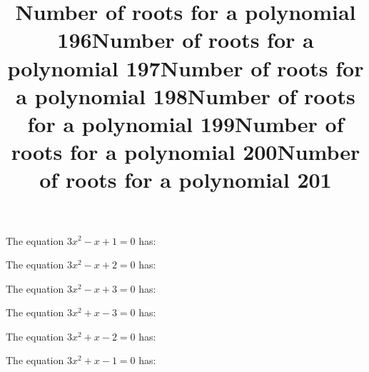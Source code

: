 \documentclass{article}
\begin{document}
\begin{category}
\begin{question}[multichoice]

\end{question}
\begin{question}[multichoice]
\title{Number of roots for a polynomial 196}
The equation $3 x^{2} - x + 1=0$ has:


\end{question}
\begin{question}[multichoice]
\title{Number of roots for a polynomial 197}
The equation $3 x^{2} - x + 2=0$ has:


\end{question}
\begin{question}[multichoice]
\title{Number of roots for a polynomial 198}
The equation $3 x^{2} - x + 3=0$ has:


\end{question}
\begin{question}[multichoice]
\title{Number of roots for a polynomial 199}
The equation $3 x^{2} + x - 3=0$ has:


\end{question}
\begin{question}[multichoice]
\title{Number of roots for a polynomial 200}
The equation $3 x^{2} + x - 2=0$ has:


\end{question}
\begin{question}[multichoice]
\title{Number of roots for a polynomial 201}
The equation $3 x^{2} + x - 1=0$ has:



\end{question}
\end{category}
\end{document}
